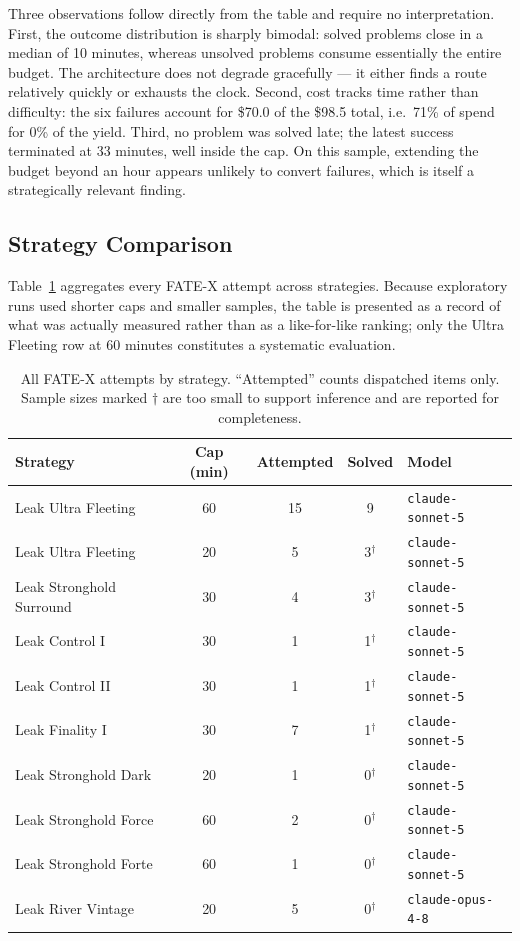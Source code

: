 \documentclass[12pt, a4paper]{article}
\begin{document}
Three observations follow directly from the table and require no
interpretation. First, the outcome distribution is sharply bimodal: solved
problems close in a median of 10 minutes, whereas unsolved problems consume
essentially the entire budget. The architecture does not degrade
gracefully --- it either finds a route relatively quickly or exhausts the
clock. Second, cost tracks time rather than difficulty: the six failures
account for \$70.0 of the \$98.5 total, i.e.\ 71\% of spend for 0\% of the
yield. Third, no problem was solved late; the latest success terminated at
33 minutes, well inside the cap. On this sample, extending the budget beyond
an hour appears unlikely to convert failures, which is itself a
strategically relevant finding.

\subsection{Strategy Comparison}

Table~\ref{tab:fatex-strategies} aggregates every FATE-X attempt across
strategies. Because exploratory runs used shorter caps and smaller samples,
the table is presented as a record of what was actually measured rather than
as a like-for-like ranking; only the Ultra Fleeting row at 60 minutes
constitutes a systematic evaluation.

\begin{table}[H]
  \centering
  \caption{All FATE-X attempts by strategy. ``Attempted'' counts dispatched
  items only. Sample sizes marked $\dagger$ are too small to support
  inference and are reported for completeness.}
  \label{tab:fatex-strategies}
  \renewcommand{\arraystretch}{1.3}
  \begin{tabular}{lcccl}
    \toprule
    Strategy & Cap (min) & Attempted & Solved & Model \\
    \midrule
    Leak Ultra Fleeting      & 60 & 15 & 9 & \texttt{claude-sonnet-5} \\
    Leak Ultra Fleeting      & 20 & 5  & 3$^\dagger$ & \texttt{claude-sonnet-5} \\
    Leak Stronghold Surround & 30 & 4  & 3$^\dagger$ & \texttt{claude-sonnet-5} \\
    Leak Control I           & 30 & 1  & 1$^\dagger$ & \texttt{claude-sonnet-5} \\
    Leak Control II          & 30 & 1  & 1$^\dagger$ & \texttt{claude-sonnet-5} \\
    Leak Finality I          & 30 & 7  & 1$^\dagger$ & \texttt{claude-sonnet-5} \\
    Leak Stronghold Dark     & 20 & 1  & 0$^\dagger$ & \texttt{claude-sonnet-5} \\
    Leak Stronghold Force    & 60 & 2  & 0$^\dagger$ & \texttt{claude-sonnet-5} \\
    Leak Stronghold Forte    & 60 & 1  & 0$^\dagger$ & \texttt{claude-sonnet-5} \\
    Leak River Vintage       & 20 & 5  & 0$^\dagger$ & \texttt{claude-opus-4-8} \\
    \bottomrule
  \end{tabular}
\end{table}
\end{document}

